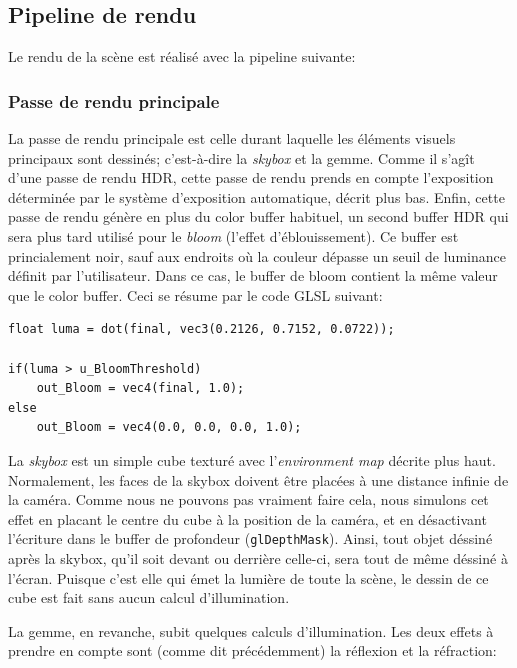 \documentclass[a4paper,12pt]{article}
\newcommand{\svg}[2][0cm]{
    \begin{figure}[H]
        \centering
        \def\svgwidth{\columnwidth - #1}
        
    \end{figure}
}
\begin{document}
\subsection{Pipeline de rendu}
Le rendu de la scène est réalisé avec la pipeline suivante:
\svg{PipelineDeRendu}

\subsubsection{Passe de rendu principale}
La passe de rendu principale est celle durant laquelle les éléments visuels principaux sont dessinés; c'est-à-dire
la \emph{skybox} et la gemme. Comme il s'agît d'une passe de rendu HDR, cette passe de rendu prends en compte
l'exposition déterminée par le système d'exposition automatique, décrit plus bas. Enfin, cette passe de rendu
génère en plus du color buffer habituel, un second buffer HDR qui sera plus tard utilisé pour le \emph{bloom}
(l'effet d'éblouissement). Ce buffer est princialement noir, sauf aux endroits où la couleur dépasse un
seuil de luminance définit par l'utilisateur. Dans ce cas, le buffer de bloom contient la même valeur que le color
buffer. Ceci se résume par le code GLSL suivant:

\begin{lstlisting}
float luma = dot(final, vec3(0.2126, 0.7152, 0.0722));

if(luma > u_BloomThreshold)
    out_Bloom = vec4(final, 1.0);
else
    out_Bloom = vec4(0.0, 0.0, 0.0, 1.0);
\end{lstlisting}

La \emph{skybox} est un simple cube texturé avec l'\emph{environment map} décrite plus haut. Normalement, les faces
de la skybox doivent être placées à une distance infinie de la caméra. Comme nous ne pouvons pas vraiment faire cela,
nous simulons cet effet en placant le centre du cube à la position de la caméra, et en désactivant l'écriture dans le buffer
de profondeur (\texttt{glDepthMask}). Ainsi, tout objet déssiné après la skybox, qu'il soit devant ou derrière
celle-ci, sera tout de même déssiné à l'écran. Puisque c'est elle qui émet la lumière de toute la scène, le dessin de
ce cube est fait sans aucun calcul d'illumination.

La gemme, en revanche, subit quelques calculs d'illumination. Les deux effets à prendre en compte sont (comme dit précédemment)
la réflexion et la réfraction:
\svg[8cm]{refraction}
\end{document}
